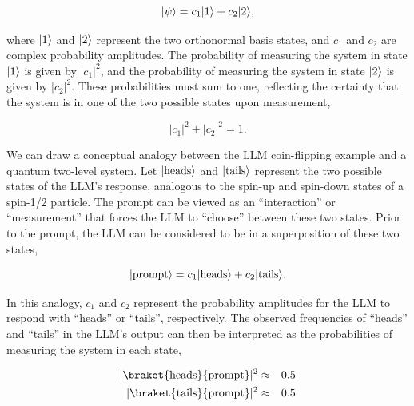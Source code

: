 \documentclass[prd,amsmath,amssymb,12pt]{revtex4}
\DeclarePairedDelimiter\ket{\lvert}{\rangle}
\begin{document}
\begin{equation}
    \ket{\psi} = c_1\ket{1} + c_2\ket{2},
\end{equation}

\noindent
where $\ket{1}$ and $\ket{2}$ represent the two orthonormal basis states, and $c_1$ and $c_2$ are complex
probability amplitudes. The probability of measuring the system in state $\ket{1}$ is given by $|c_1|^2$,
and the probability of measuring the system in state $\ket{2}$ is given by $|c_2|^2$. These probabilities
must sum to one, reflecting the certainty that the system is in one of the two possible states upon measurement,

\begin{equation}
    |c_1|^2 + |c_2|^2 = 1.
\end{equation}

\noindent
We can draw a conceptual analogy between the LLM coin-flipping example and a quantum two-level system.
Let $\ket{\text{heads}}$ and $\ket{\text{tails}}$ represent the two possible states of the LLM's response,
analogous to the spin-up and spin-down states of a spin-1/2 particle. The prompt can be viewed as
an ``interaction'' or ``measurement'' that forces the LLM to ``choose'' between these two states. Prior to
the prompt, the LLM can be considered to be in a superposition of these two states,

\begin{equation}
    \ket{\text{prompt}} = c_1\ket{\text{heads}} + c_2\ket{\text{tails}}.
\end{equation}

\noindent
In this analogy, $c_1$ and $c_2$ represent the probability amplitudes for the LLM to respond with ``heads'' or ``tails'',
respectively. The observed frequencies of ``heads'' and ``tails'' in the LLM's output can then be interpreted as the
probabilities of measuring the system in each state,

\begin{eqnarray}
    |\braket{\text{heads}}{\text{prompt}}|^2 &\approx& 0.5 \\
    |\braket{\text{tails}}{\text{prompt}}|^2 &\approx& 0.5
\end{eqnarray}
\end{document}
